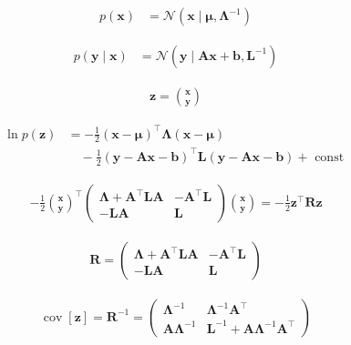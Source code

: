 \documentclass{article}
\begin{document}
\begin{align*}
p(\mathbf{x}) & = \mathcal{N}\left(\mathbf{x} \mid \boldsymbol{\mu}, \boldsymbol{\Lambda}^{-1}\right) 
\tag{3.83}
\end{align*}

\begin{align*}
p(\mathbf{y} \mid \mathbf{x}) & = \mathcal{N}\left(\mathbf{y} \mid \mathbf{A} \mathbf{x} + \mathbf{b}, \mathbf{L}^{-1}\right)
\tag{3.84}
\end{align*}

\begin{align*}
\mathbf{z} = \binom{\mathbf{x}}{\mathbf{y}} 
\tag{3.85}
\end{align*}

\begin{align*}
\ln p(\mathbf{z}) 
& = -\frac{1}{2} (\mathbf{x} - \boldsymbol{\mu})^{\top} \boldsymbol{\Lambda} (\mathbf{x} - \boldsymbol{\mu}) \\
& \quad - \frac{1}{2} (\mathbf{y} - \mathbf{A} \mathbf{x} - \mathbf{b})^{\top} \mathbf{L} (\mathbf{y} - \mathbf{A} \mathbf{x} - \mathbf{b}) + \text{ const }
\tag{3.86}
\end{align*}

\begin{align*}
-\frac{1}{2} \binom{\mathbf{x}}{\mathbf{y}}^{\top} \left(\begin{array}{cc}
\boldsymbol{\Lambda} + \mathbf{A}^{\top} \mathbf{L} \mathbf{A} & -\mathbf{A}^{\top} \mathbf{L} \\
-\mathbf{L} \mathbf{A} & \mathbf{L}
\end{array} \right) \binom{\mathbf{x}}{\mathbf{y}} = -\frac{1}{2} \mathbf{z}^{\top} \mathbf{R} \mathbf{z}
\tag{3.87}
\end{align*}

\begin{align*}
\mathbf{R} = \left(\begin{array}{cc}
\boldsymbol{\Lambda} + \mathbf{A}^{\top} \mathbf{L} \mathbf{A} & -\mathbf{A}^{\top} \mathbf{L} \\
-\mathbf{L} \mathbf{A} & \mathbf{L}
\end{array} \right)
\tag{3.88}
\end{align*}

\begin{align*}
\operatorname{cov}[\mathbf{z}] = \mathbf{R}^{-1} = \left(\begin{array}{cc}
\boldsymbol{\Lambda}^{-1} & \boldsymbol{\Lambda}^{-1} \mathbf{A}^{\top} \\
\mathbf{A} \boldsymbol{\Lambda}^{-1} & \mathbf{L}^{-1} + \mathbf{A} \boldsymbol{\Lambda}^{-1} \mathbf{A}^{\top}
\end{array} \right)
\tag{3.89}
\end{align*}
\end{document}
